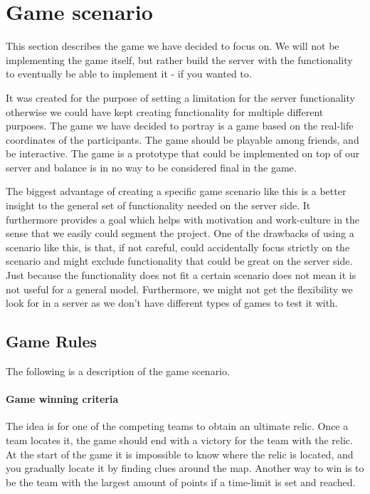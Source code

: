 \section{Game scenario}\label{sec:game}

This section describes the game we have decided to focus on. We will not be implementing the game itself, but rather build the server with the functionality to eventually be able to implement it - if you wanted to. 

It was created for the purpose of setting a limitation for the server functionality otherwise we could have kept creating functionality for multiple different purposes. The game we have decided to portray is a game based on the real-life coordinates of the participants. The game should be playable among friends, and be interactive. The game is a prototype that could be implemented on top of our server and balance is in no way to be considered final in the game.

The biggest advantage of creating a specific game scenario like this is a better insight to the general set of functionality needed on the server side. It furthermore provides a goal which helps with motivation and work-culture in the sense that we easily could segment the project. One of the drawbacks of using a scenario like this, is that, if not careful, could accidentally focus strictly on the scenario and might exclude functionality that could be great on the server side. Just because the functionality does not fit a certain scenario does not mean it is not useful for a general model. Furthermore, we might not get the flexibility we look for in a server as we don't have different types of games to test it with.

\subsection{Game Rules}\label{subsec:game-rules}

The following is a description of the game scenario.

\paragraph{Game winning criteria}
The idea is for one of the competing teams to obtain an ultimate relic. Once a team locates it, the game should end with a victory for the team with the relic. At the start of the game it is impossible to know where the relic is located, and you gradually locate it by finding clues around the map.
Another way to win is to be the team with the largest amount of points if a time-limit is set and reached.


